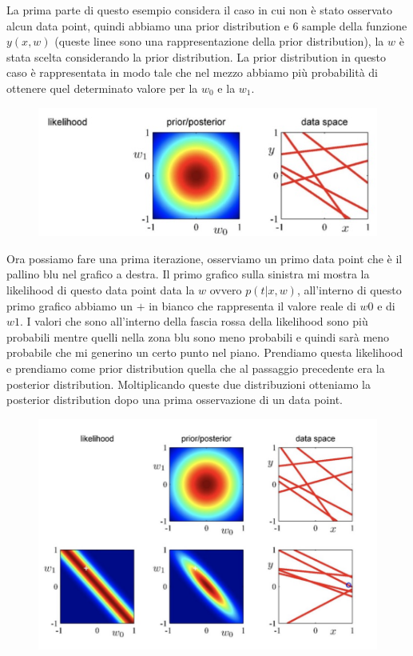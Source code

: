 \documentclass[14pt]{extreport}
\begin{document}
La prima parte di questo esempio considera il caso in cui non è stato osservato alcun data point, quindi abbiamo una prior distribution e 6 sample
della funzione $y(x,w)$ (queste linee sono una rappresentazione della prior distribution), la $w$ è stata scelta considerando la prior distribution.
La prior distribution in questo caso è rappresentata in modo tale che nel mezzo abbiamo più probabilità di ottenere quel determinato valore per la
$w_0$ e la $w_1$.

\begin{figure}[H]
\centering
\includegraphics[width=0.7\linewidth]{132.jpeg}
\end{figure}

Ora possiamo fare una prima iterazione, osserviamo un primo data point che è il pallino blu nel grafico a destra. Il primo grafico sulla sinistra mi
mostra la likelihood di questo data point data la $w$ ovvero $p(t|x,w)$, all'interno di questo primo grafico abbiamo un $+$ in bianco che rappresenta
il valore reale di $w0$ e di $w1$. I valori che sono all'interno della fascia rossa della likelihood sono più probabili mentre quelli nella zona blu
sono meno probabili e quindi sarà meno probabile che mi generino un certo punto nel piano. Prendiamo questa likelihood e prendiamo come prior
distribution quella che al passaggio precedente era la posterior distribution. Moltiplicando queste due distribuzioni otteniamo la posterior
distribution dopo una prima osservazione di un data point.

\begin{figure}[H]
\centering
\includegraphics[width=0.7\linewidth]{133.jpeg}
\end{figure}
\end{document}
